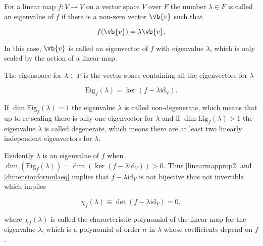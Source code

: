 \documentclass[a4paper,12pt]{report}
\begin{document}
\begin{definition}
For a linear map \(f:V \rightarrow V\) on a vector space \(V\) over \(F\) the number \(\lambda \in F\) is called an eigenvalue of \(f\) if there is a non-zero vector \(\vb{v} \) such that 

\begin{equation}
    f(\vb{v} ) = \lambda \vb{v} .
\end{equation}

In this case, \(\vb{v} \) is called an eigenvector of \(f\) with eigenvalue \(\lambda \), which is only scaled by the action of a linear map.

\end{definition}

\begin{definition}
The eigenspace for \(\lambda \in F\) is the vector space containing all the eigenvectors for \(\lambda \) 

\begin{equation}
    \text{Eig}_{f}(\lambda ) = \ker (f - \lambda \mathrm{id}_{V} ).
\end{equation}
\end{definition}

If \(\dim \text{Eig}_{f}(\lambda ) = 1 \) the eigenvalue \(\lambda\) is called non-degenerate, which means that up to re-scaling there is only one eigenvector for \(\lambda \) and if \(\dim \text{Eig}_{f}(\lambda ) > 1  \) the eigenvalue \(\lambda \) is called degenerate, which means there are at least two linearly independent eigenvectors for \(\lambda \).        

Evidently \(\lambda \) is an eigenvalue of \(f\) when \(\dim (\text{Eig}_{f}(\lambda )) = \dim (\ker (f-\lambda \mathrm{id}_{V} )) > 0\). Thus \cref{linearmapprop2} and \cref{dimensionformulaeq} implies that \(f - \lambda \mathrm{id}_{V} \) is not bijective thus not invertible which implies

\begin{equation}
    \chi _{f}(\lambda ) \equiv \det (f - \lambda \mathrm{id}_{V} ) = 0,
\end{equation}

where \(\chi _{f}(\lambda ) \) is called the characteristic polynomial of the linear map for the eigenvalue \(\lambda \), which is a polynomial of order \(n\) in \(\lambda \) whose coefficients depend on \(f\).
\end{document}

